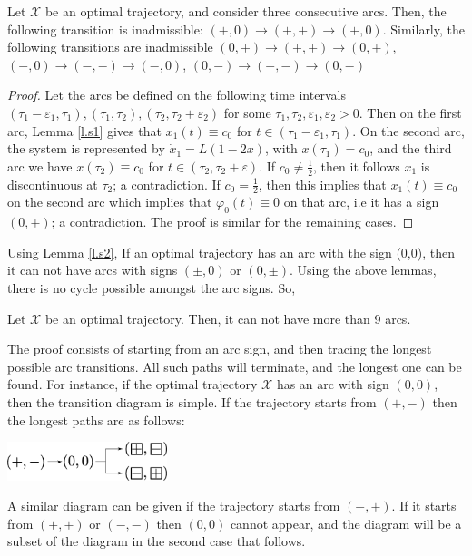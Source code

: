 \begin{lemma}
	Let $\mathscr X$ be an optimal trajectory, and consider three consecutive arcs. 
	Then, the following transition is  inadmissible: $(+,0) \to (+,+) \to (+,0)$. 
	Similarly, the following transitions are inadmissible $(0,+) \to (+,+) \to (0,+)$, $(-,0) \to (-,-) \to (-,0)$, $(0,-) \to (-,-) \to (0,-)$
\end{lemma}
%
\begin{proof}
	Let the arcs be defined on the following time intervals $(\tau_1-\varepsilon_1,\tau_1), (\tau_1,\tau_2), (\tau_2, \tau_2+\varepsilon_2) $ for some $\tau_1,\tau_2,\varepsilon_1,\varepsilon_2>0$. 
	Then on the first arc, Lemma \ref{l.s1} gives that $x_1(t)\equiv c_0$ for $t \in (\tau_1-\varepsilon_1,\tau_1)$. 
	On the second arc, the system is represented by $\dot x_1 = L(1-2x)$, with $x(\tau_1)=c_0$, and the third arc we have $x(\tau_2)\equiv c_0$ for $t \in (\tau_2,\tau_2+\varepsilon)$. 
	If $c_0 \ne \tfrac 12$, then it follows  $x_1$ is discontinuous at $\tau_2$; a contradiction. If $c_0=\tfrac 12$, then this implies that $x_1(t)\equiv c_0$ on the second arc which implies that $\varphi_0(t)\equiv 0$ on that arc, i.e it has a sign $(0,+)$; a contradiction. 
	The proof is similar for the remaining cases.
\end{proof}


Using Lemma \ref{l.s2}, If an optimal trajectory has an arc with the sign (0,0), then it can not have arcs with signs $(\pm,0)$ or $(0,\pm)$.
Using the above lemmas, there is no cycle possible amongst the arc signs. So,
%
\begin{proposition} \label{prop:17}
	Let $\mathscr X$ be an optimal trajectory. Then, it can not have more than 9 arcs.  
\end{proposition}
%
The proof consists of starting from an arc sign, and then tracing the longest possible arc transitions. All such paths will terminate, and the longest one can be found.
For instance,  if the optimal trajectory $\mathscr X$ has an arc with sign $(0,0)$, then the transition diagram is simple. 
If the trajectory starts from $(+,-)$ then the longest paths are as follows:
\begin{center}
	\includegraphics[width=0.35\textwidth]{fig/case_i.eps}
\end{center}
A similar diagram can be given if the trajectory starts from $(-,+)$. 
If it starts from $(+,+)$ or $(-,-)$ then $(0,0)$ cannot appear, and the diagram will be a subset of the diagram in the second case that follows.

